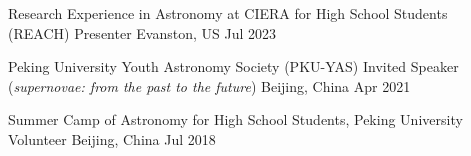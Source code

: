 \begin{cventries}

\cventry
{Research Experience in Astronomy at CIERA for High School Students (REACH)}
{Presenter}
{Evanston, US}
{Jul 2023}
{}

\cventry
{Peking University Youth Astronomy Society (PKU-YAS)}
{Invited Speaker (\textit{supernovae: from the past to the future})}
{Beijing, China}
{Apr 2021}
{}


\cventry
{Summer Camp of Astronomy for High School Students, Peking University} %
{Volunteer} %
{Beijing, China} %
{Jul 2018} %
{ %
}




{ %
}

\end{cventries}